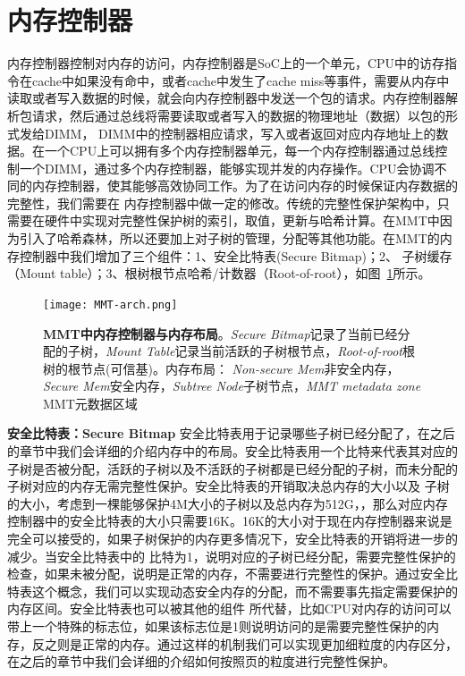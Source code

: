 \section{内存控制器}
内存控制器控制对内存的访问，内存控制器是SoC上的一个单元，CPU中的访存指令在cache中如果没有命中，或者cache中发生了cache miss等事件，需要从内存中读取或者写入数据的时候，就会向内存控制器中发送一个包的请求。内存控制器解析包请求，然后通过总线将需要读取或者写入的数据的物理地址（数据）以包的形式发给DIMM，
DIMM中的控制器相应请求，写入或者返回对应内存地址上的数据。在一个CPU上可以拥有多个内存控制器单元，每一个内存控制器通过总线控制一个DIMM，通过多个内存控制器，能够实现并发的内存操作。CPU会协调不同的内存控制器，使其能够高效协同工作。为了在访问内存的时候保证内存数据的完整性，我们需要在
内存控制器中做一定的修改。传统的完整性保护架构中，只需要在硬件中实现对完整性保护树的索引，取值，更新与哈希计算。在MMT中因为引入了哈希森林，所以还要加上对子树的管理，分配等其他功能。在MMT的内存控制器中我们增加了三个组件：1、安全比特表(Secure Bitmap)；2、
子树缓存（Mount table）；3、根树根节点哈希/计数器（Root-of-root），如图~\ref{fig:MMT-arch.png}所示。
\begin{figure}[!htp]
    \centering
    \texttt{[image: MMT-arch.png]}
    \caption{\textbf{MMT中内存控制器与内存布局}。\emph{Secure Bitmap}记录了当前已经分配的子树，\emph{Mount Table}记录当前活跃的子树根节点，\emph{Root-of-root}根树的根节点(可信基)。内存布局：
    \emph{Non-secure Mem}非安全内存，\emph{Secure Mem}安全内存，\emph{Subtree Node}子树节点，\emph{MMT metadata zone} MMT元数据区域}
   \label{fig:MMT-arch.png}
\end{figure}

\textbf{安全比特表：Secure Bitmap}
安全比特表用于记录哪些子树已经分配了，在之后的章节中我们会详细的介绍内存中的布局。安全比特表用一个比特来代表其对应的子树是否被分配，活跃的子树以及不活跃的子树都是已经分配的子树，而未分配的子树对应的内存无需完整性保护。安全比特表的开销取决总内存的大小以及
子树的大小，考虑到一棵能够保护4M大小的子树以及总内存为512G，，那么对应内存控制器中的安全比特表的大小只需要16K。16K的大小对于现在内存控制器来说是完全可以接受的，如果子树保护的内存更多情况下，安全比特表的开销将进一步的减少。当安全比特表中的
比特为1，说明对应的子树已经分配，需要完整性保护的检查，如果未被分配，说明是正常的内存，不需要进行完整性的保护。通过安全比特表这个概念，我们可以实现动态安全内存的分配，而不需要事先指定需要保护的内存区间。安全比特表也可以被其他的组件
所代替，比如CPU对内存的访问可以带上一个特殊的标志位，如果该标志位是1则说明访问的是需要完整性保护的内存，反之则是正常的内存。通过这样的机制我们可以实现更加细粒度的内存区分，在之后的章节中我们会详细的介绍如何按照页的粒度进行完整性保护。

